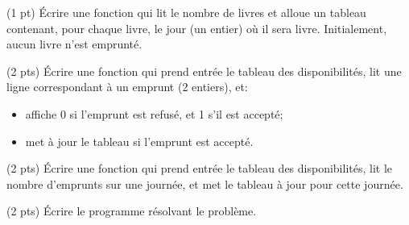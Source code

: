 \question (1 pt) Écrire une fonction qui lit le nombre de livres et
alloue un tableau contenant, pour chaque livre, le jour (un entier)
o\`u il sera livre. Initialement, aucun livre n'est emprunté.

\question (2 pts) Écrire une fonction qui prend entrée le tableau des
disponibilités, lit une ligne correspondant à un emprunt (2 entiers), et:
\begin{itemize}
\item affiche 0 si l'emprunt est refusé, et 1 s'il est accepté;
\item met à jour le tableau si l'emprunt est accepté.
\end{itemize}

\question (2 pts) Écrire une fonction qui prend entrée le tableau des
disponibilités, lit le nombre d'emprunts sur une journée, et met le
tableau à jour pour cette journée.

\question (2 pts) Écrire le programme résolvant le problème.


